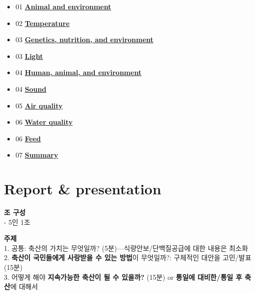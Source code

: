\documentclass[]{book}
\providecommand{\tightlist}{%
  \setlength{\itemsep}{0pt}\setlength{\parskip}{0pt}}
\begin{document}
\begin{itemize}
\tightlist
\item
  01
  \textbf{\href{https://youngjunna.github.io/aes/02-AnimalandEnvironment}{Animal
  and environment}}\\
\item
  02
  \textbf{\href{https://youngjunna.github.io/aes/03-Temperature}{Temperature}}\\
\item
  03
  \textbf{\href{https://github.com/YoungjunNa/2019-animal-nutrition-and-the-environment/raw/master/03\%E1\%84\%8C\%E1\%85\%AE\%E1\%84\%8E\%E1\%85\%A1-\%E1\%84\%83\%E1\%85\%A9\%E1\%86\%BC\%E1\%84\%86\%E1\%85\%AE\%E1\%86\%AF\%E1\%84\%92\%E1\%85\%AA\%E1\%86\%AB\%E1\%84\%80\%E1\%85\%A7\%E1\%86\%BC\%E1\%84\%92\%E1\%85\%A1\%E1\%86\%A8.pdf}{Genetics,
  nutrition, and environment}}\\
\item
  03 \textbf{\href{https://youngjunna.github.io/aes/04-Light}{Light}}\\
\item
  04
  \textbf{\href{https://github.com/YoungjunNa/aes/raw/master/04-aes.pdf}{Human,
  animal, and environment}}\\
\item
  04 \textbf{\href{https://youngjunna.github.io/aes/05-Sound}{Sound}}\\
\item
  05 \textbf{\href{https://youngjunna.github.io/aes/06-AirQuality}{Air
  quality}}\\
\item
  06
  \textbf{\href{https://youngjunna.github.io/aes/07-WaterQuality}{Water
  quality}}\\
\item
  06
  \textbf{\href{https://youngjunna.github.io/aes/08-ByProducts}{Feed}}\\
\item
  07 \textbf{\href{https://youngjunna.github.io/aes/Summary}{Summary}}
\end{itemize}

\section{Report \& presentation}\label{report-presentation}

\textbf{조 구성}\\
- 5인 1조

\textbf{주제}\\
1. 공통: 축산의 가치는 무엇일까? (5분)---식량안보/단백질공급에 대한
내용은 최소화\\
2. \textbf{축산이 국민들에게 사랑받을 수 있는 방법}이 무엇일까?:
구체적인 대안을 고민/발표(15분)\\
3. 어떻게 해야 \textbf{지속가능한 축산이 될 수 있을까?} (15분) or
\textbf{통일에 대비한/통일 후 축산}에 대해서
\end{document}
